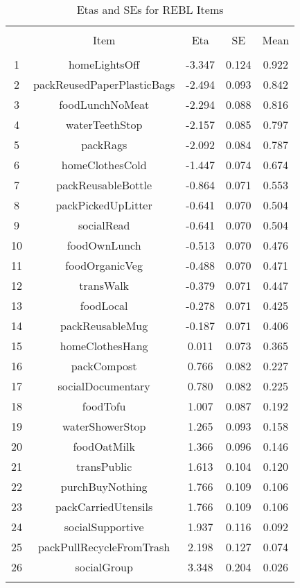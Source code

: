 
\begin{table}[!htbp] \centering 
  \caption{Etas and SEs for REBL Items} 
  \label{} 
\begin{tabular}{@{\extracolsep{5pt}} ccccc} 
\\[-1.8ex]\hline 
\hline \\[-1.8ex] 
 & Item & Eta & SE & Mean \\ 
\hline \\[-1.8ex] 
1 & homeLightsOff & -3.347 & 0.124 & 0.922 \\ 
2 & packReusedPaperPlasticBags & -2.494 & 0.093 & 0.842 \\ 
3 & foodLunchNoMeat & -2.294 & 0.088 & 0.816 \\ 
4 & waterTeethStop & -2.157 & 0.085 & 0.797 \\ 
5 & packRags & -2.092 & 0.084 & 0.787 \\ 
6 & homeClothesCold & -1.447 & 0.074 & 0.674 \\ 
7 & packReusableBottle & -0.864 & 0.071 & 0.553 \\ 
8 & packPickedUpLitter & -0.641 & 0.070 & 0.504 \\ 
9 & socialRead & -0.641 & 0.070 & 0.504 \\ 
10 & foodOwnLunch & -0.513 & 0.070 & 0.476 \\ 
11 & foodOrganicVeg & -0.488 & 0.070 & 0.471 \\ 
12 & transWalk & -0.379 & 0.071 & 0.447 \\ 
13 & foodLocal & -0.278 & 0.071 & 0.425 \\ 
14 & packReusableMug & -0.187 & 0.071 & 0.406 \\ 
15 & homeClothesHang &  0.011 & 0.073 & 0.365 \\ 
16 & packCompost &  0.766 & 0.082 & 0.227 \\ 
17 & socialDocumentary &  0.780 & 0.082 & 0.225 \\ 
18 & foodTofu &  1.007 & 0.087 & 0.192 \\ 
19 & waterShowerStop &  1.265 & 0.093 & 0.158 \\ 
20 & foodOatMilk &  1.366 & 0.096 & 0.146 \\ 
21 & transPublic &  1.613 & 0.104 & 0.120 \\ 
22 & purchBuyNothing &  1.766 & 0.109 & 0.106 \\ 
23 & packCarriedUtensils &  1.766 & 0.109 & 0.106 \\ 
24 & socialSupportive &  1.937 & 0.116 & 0.092 \\ 
25 & packPullRecycleFromTrash &  2.198 & 0.127 & 0.074 \\ 
26 & socialGroup &  3.348 & 0.204 & 0.026 \\ 
\hline \\[-1.8ex] 
\end{tabular} 
\end{table} 
